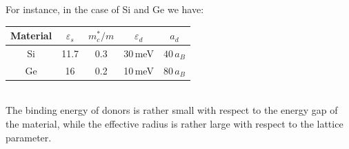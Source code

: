 \documentclass[10.75pt,a4paper,openright,bottom=2cm]{article}
\begin{document}
\newpage
\noindent
For instance, in the case of Si and Ge we have:
\begin{table}[h]
    \centering
    \begin{tabular}{c|cccc}
    \hline
    Material & $\varepsilon_s$ & $m_c^*/m$ & $\varepsilon_d$ & $a_d$ \\
    \hline\hline
    Si & 11.7 & 0.3 & 30\,meV & $40\,a_B$\\
    Ge & 16 & 0.2 & 10\,meV & $80\,a_B$\\
    \hline
    \end{tabular}
\end{table}\\
\noindent The binding energy of donors is rather small with respect to the energy gap of the material, while the effective radius is rather large with respect to the lattice parameter.
\end{document}
